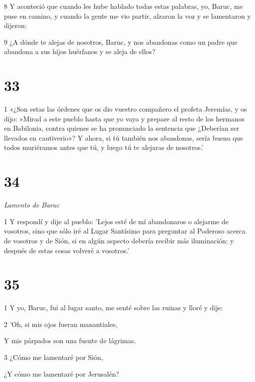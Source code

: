 \par 8 Y aconteció que cuando les hube hablado todas estas palabras, yo, Baruc, me puse en camino, y cuando la gente me vio partir, alzaron la voz y se lamentaron y dijeron:

\par 9 ¿A dónde te alejas de nosotros, Baruc, y nos abandonas como un padre que abandona a sus hijos huérfanos y se aleja de ellos?

\chapter{33}

\par 1 «¿Son estas las órdenes que os dio vuestro compañero el profeta Jeremías, y os dijo: »Mirad a este pueblo hasta que yo vaya y prepare al resto de los hermanos en Babilonia, contra quienes se ha pronunciado la sentencia que ¿Deberían ser llevados en cautiverio»? Y ahora, si tú también nos abandonas, sería bueno que todos muriéramos antes que tú, y luego tú te alejaras de nosotros.'

\chapter{34}

\par \textit{Lamento de Baruc}

\par 1 Y respondí y dije al pueblo: 'Lejos esté de mí abandonaros o alejarme de vosotros, sino que sólo iré al Lugar Santísimo para preguntar al Poderoso acerca de vosotros y de Sión, si en algún aspecto debería recibir más iluminación: y después de estas cosas volveré a vosotros.'

\chapter{35}

\par 1 Y yo, Baruc, fui al lugar santo, me senté sobre las ruinas y lloré y dije:

\par 2 'Oh, si mis ojos fueran manantiales,

\par Y mis párpados son una fuente de lágrimas.

\par 3 ¿Cómo me lamentaré por Sión,

\par ¿Y cómo me lamentaré por Jerusalén?

